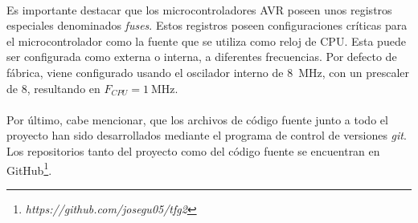 

\paragraph{}
Es importante destacar que los microcontroladores AVR poseen unos registros especiales denominados \textit{fuses}.
Estos registros poseen configuraciones cr\'iticas para el microcontrolador como la fuente que se utiliza como reloj de CPU. Esta puede ser configurada como externa o interna, a diferentes frecuencias. Por defecto de fábrica, viene configurado usando el oscilador interno de \SI{8}{\mega\hertz}, con un prescaler de 8, resultando en $F_{CPU} = \SI{1}{\mega\hertz}$.
\paragraph{}
Por último, cabe mencionar, que los archivos de código fuente junto a todo el proyecto han sido desarrollados mediante el programa de control de versiones \textit{git}. 
Los repositorios tanto del proyecto como del código fuente se encuentran en GitHub\footnote{\textit{https://github.com/josegu05/tfg2}}.

